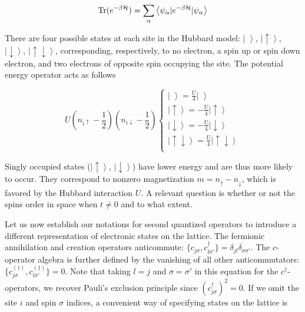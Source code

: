 \begin{equation}\label{eq:z_asEigen}
\operatorname{Tr} ( e^{-\beta \mathcal{H} } )= \sum_\alpha \left\langle \psi_\alpha | e^{-\beta \mathcal{H} } | \psi_\alpha \right\rangle
\end{equation}

There are four possible states at each site in the Hubbard model: $\left| \,\, \right\rangle$, $\left|\uparrow \right\rangle$, $\left|\downarrow\right \rangle$, $\left|\uparrow \downarrow \right\rangle $, corresponding, respectively, to no electron, a spin up or spin down electron, and two electrons of opposite spin occupying the site.
The potential energy operator acts as follows

\begin{equation}
U (n_{i\uparrow} - \frac{1}{2} ) ( n_{i\downarrow} - \frac{1}{2} ) 
\begin{cases}
\left| \,\, \right\rangle = \frac{U}{4} \left| \,\, \right\rangle \\
\left|\uparrow \right\rangle = -\frac{U}{4} \left|\uparrow \right\rangle \\
\left|\downarrow\right \rangle = -\frac{U}{4} \left|\downarrow\right \rangle \\
\left|\uparrow \downarrow \right\rangle = \frac{U}{4} \left|\uparrow \downarrow \right\rangle \\
\end{cases}
\end{equation}

Singly occupied states ($\left|\uparrow \right\rangle$, $\left|\downarrow\right \rangle$) have lower energy and are thus more likely to occur.
They correspond to nonzero magnetization $m = n_{\uparrow} - n_{\downarrow}$, which is favored by the Hubbard interaction $U$.
A relevant question is whether or not the spins order in space when $t \neq 0$ and to what extent.

Let us now establish our notations for second quantized operators to introduce a different representation of electronic states on the lattice.
The fermionic annihilation and creation operators anticommute:
$\{ c_{j\sigma} , c_{l \sigma'}^\dagger \} = \delta_{jl} \delta_{\sigma\sigma'}$.
The $c$-operator algebra is further defined by the vanishing of all other anticommutators:$
\{ c_{j\sigma}^{(\dagger)} , c_{l \sigma'}^{(\dagger)} \} = 0$.
Note that taking $l = j$ and $\sigma = \sigma'$ in this equation for the $c^\dagger$-operators, we recover Pauli's exclusion principle since $(c_{j\sigma}^\dagger)^2 = 0$.
If we omit the site $i$ and spin $\sigma$ indices, a convenient way of specifying states on the lattice is

